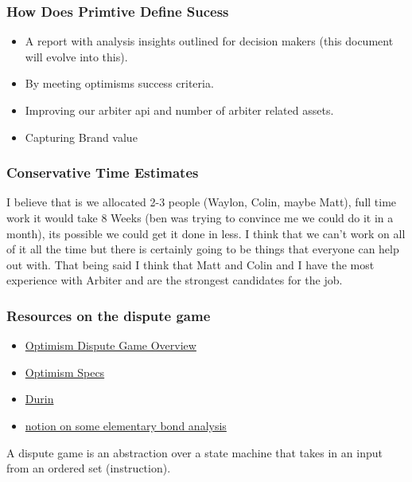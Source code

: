 \subsubsection{How Does Primtive Define Sucess}

\begin{itemize}
  \item A report with analysis insights outlined for decision makers (this document will evolve into this).
  \item By meeting optimisms success criteria.
  \item Improving our arbiter api and number of arbiter related assets.
  \item Capturing Brand value 
\end{itemize}

\subsubsection{Conservative Time Estimates}
I believe that is we allocated 2-3 people (Waylon, Colin, maybe Matt), full time work it would take 8 Weeks (ben was trying to convince me we could do it in a month), its possible we could get it done in less. 
I think that we can't work on all of it all the time but there is certainly going to be things that everyone can help out with.
That being said I think that Matt and Colin and I have the most experience with Arbiter and are the strongest candidates for the job.
\subsubsection{Resources on the dispute game}

\begin{itemize}
  \item \href{https://www.youtube.com/watch?v=nIN5sNc6nQM}{Optimism Dispute Game Overview}
  \item \href{https://github.com/ethereum-optimism/optimism/blob/develop/specs/fault-dispute-game.md}{Optimism Specs}
  \item \href{https://github.com/anton-rs/durin}{Durin}
  \item \href{https://www.notion.so/oplabs/Bondorama-886cd1cfefcc44649f3e16f47d9a4477?pvs=4}{notion on some elementary bond analysis}
\end{itemize}

A dispute game is an abstraction over a state machine that takes in an input from an ordered set (instruction).

